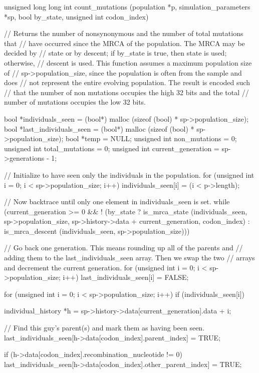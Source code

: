 \documentclass{article}
\begin{document}
\begin{ccode}
unsigned long long int count_mutations (population *p, simulation_parameters *sp, bool by_state,
					unsigned int codon_index) {
  // Returns the number of nonsynonymous and the number of total mutations that
  // have occurred since the MRCA of the population. The MRCA may be decided by
  // state or by descent; if by_state is true, then state is used; otherwise,
  // descent is used. This function assumes a maximum population size of
  // sp->population_size, since the population is often from the sample and does
  // not represent the entire evolving population. The result is encoded such
  // that the number of non mutations occupies the high 32 bits and the total
  // number of mutations occupies the low 32 bits.

  bool        *individuals_seen 	= (bool*) malloc (sizeof (bool) * sp->population_size);
  bool        *last_individuals_seen	= (bool*) malloc (sizeof (bool) * sp->population_size);
  bool        *temp			= NULL;
  unsigned int non_mutations		= 0;
  unsigned int total_mutations		= 0;
  unsigned int current_generation	= sp->generations - 1;

  // Initialize to have seen only the individuals in the population.
  for (unsigned int i = 0; i < sp->population_size; i++)
    individuals_seen[i] = (i < p->length);

  // Now backtrace until only one element in individuals_seen is set.
  while (current_generation >= 0 &&
        ! (by_state ?
            is_mrca_state (individuals_seen, sp->population_size,
			   sp->history->data + current_generation, codon_index) :
            is_mrca_descent (individuals_seen, sp->population_size))) {

    // Go back one generation. This means rounding up all of the parents and
    // adding them to the last_individuals_seen array. Then we swap the two
    // arrays and decrement the current generation.
    for (unsigned int i = 0; i < sp->population_size; i++)
      last_individuals_seen[i] = FALSE;

    for (unsigned int i = 0; i < sp->population_size; i++)
      if (individuals_seen[i]) {
        individual_history *h = sp->history->data[current_generation].data + i;

        // Find this guy’s parent(s) and mark them as having been seen.
        last_individuals_seen[h->data[codon_index].parent_index] = TRUE;

        if (h->data[codon_index].recombination_nucleotide != 0)
          last_individuals_seen[h->data[codon_index].other_parent_index] = TRUE;

}}}
\end{ccode}
\end{document}
